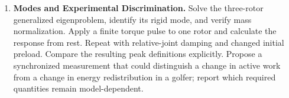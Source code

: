 \begin{enumerate}
\item \textbf{Modes and Experimental Discrimination.} Solve the three-rotor generalized eigenproblem, identify its rigid mode, and verify mass normalization. Apply a finite torque pulse to one rotor and calculate the response from rest. Repeat with relative-joint damping and changed initial preload. Compare the resulting peak definitions explicitly. Propose a synchronized measurement that could distinguish a change in active work from a change in energy redistribution in a golfer; report which required quantities remain model-dependent.
\end{enumerate}
